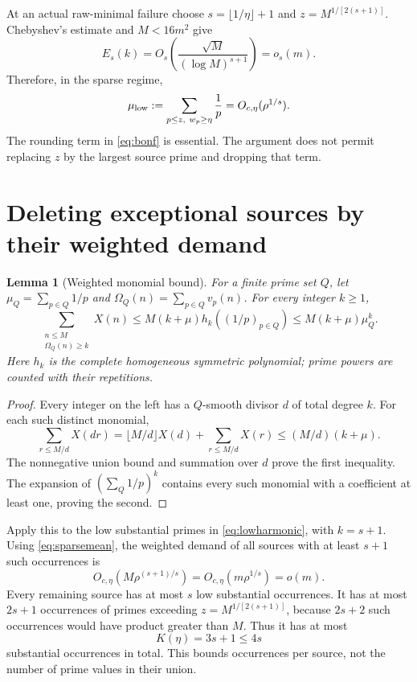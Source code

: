 \documentclass[11pt,a4paper]{article}
\newtheorem{lemma}[theorem]{Lemma}
\theoremstyle{remark}\newtheorem{remark}[theorem]{Remark}
\begin{document}
At an actual raw-minimal failure choose
\(s=\lfloor1/\eta\rfloor+1\) and \(z=M^{1/[2(s+1)]}\).
Chebyshev's estimate and \(M<16m^2\) give
\[
 E_s(k)=O_s\!\left(\frac{\sqrt M}{(\log M)^{s+1}}\right)=o_s(m).
\]
Therefore, in the sparse regime,
\begin{equation}
 \mu_{\rm low}:=\sum_{p\le z,\ w_p\ge\eta}\frac1p
 =O_{c,\eta}(\rho^{1/s}).\label{eq:lowharmonic}
\end{equation}
The rounding term in \eqref{eq:bonf} is essential. The argument does
not permit replacing \(z\) by the largest source prime and dropping
that term.

\section{Deleting exceptional sources by their weighted demand}

\begin{lemma}[Weighted monomial bound]
For a finite prime set \(Q\), let \(\mu_Q=\sum_{p\in Q}1/p\) and
\(\Omega_Q(n)=\sum_{p\in Q}v_p(n)\). For every integer \(k\ge1\),
\begin{equation}
 \sum_{\substack{n\le M\\\Omega_Q(n)\ge k}}X(n)
 \le M(k+\mu)h_k((1/p)_{p\in Q})
 \le M(k+\mu)\mu_Q^k.\label{eq:monomial}
\end{equation}
Here \(h_k\) is the complete homogeneous symmetric polynomial;
prime powers are counted with their repetitions.
\end{lemma}
\begin{proof}
Every integer on the left has a \(Q\)-smooth divisor \(d\) of total
degree \(k\). For each such distinct monomial,
\[
 \sum_{r\le M/d}X(dr)
 =\lfloor M/d\rfloor X(d)+\sum_{r\le M/d}X(r)
 \le(M/d)(k+\mu).
\]
The nonnegative union bound and summation over \(d\) prove the first
inequality. The expansion of \((\sum_Q1/p)^k\) contains every such
monomial with a coefficient at least one, proving the second.
\end{proof}

Apply this to the low substantial primes in \eqref{eq:lowharmonic},
with \(k=s+1\). Using \eqref{eq:sparsemean}, the weighted demand of all
sources with at least \(s+1\) such occurrences is
\[
 O_{c,\eta}(M\rho^{(s+1)/s})
 =O_{c,\eta}(m\rho^{1/s})=o(m).
\]
Every remaining source has at most \(s\) low substantial occurrences.
It has at most \(2s+1\) occurrences of primes exceeding
\(z=M^{1/[2(s+1)]}\), because \(2s+2\) such occurrences would have
product greater than \(M\). Thus it has at most
\begin{equation}
 K(\eta)=3s+1\le4s\label{eq:boundedocc}
\end{equation}
substantial occurrences in total. This bounds occurrences per source,
not the number of prime values in their union.
\end{document}
